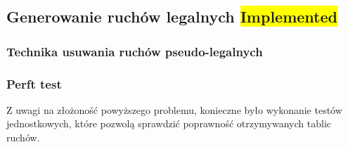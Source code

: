 \subsection{Generowanie ruchów legalnych \colorbox{yellow}{Implemented}}
\label{subsec:generowanie-ruchow-legalnych}

\subsubsection{Technika usuwania ruchów pseudo-legalnych}

\subsubsection{Perft test}

Z uwagi na złożoność powyższego problemu, konieczne było wykonanie testów jednostkowych, które pozwolą sprawdzić poprawność otrzymywanych tablic ruchów.
